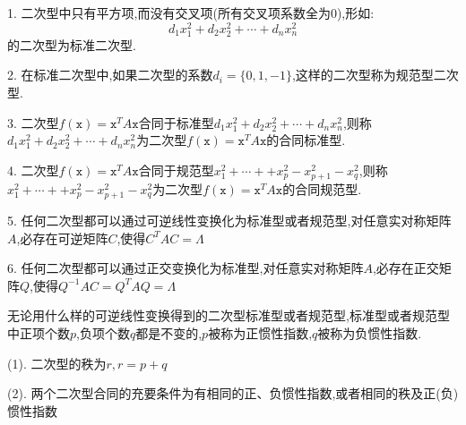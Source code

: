 \begin{definition}[标准型和规范型]
	1. 二次型中只有平方项,而没有交叉项(所有交叉项系数全为0),形如:  
	$$d_{1}x_{1}^2+d_{2}x_{2}^2+\cdots+d_{n}x_{n}^2$$
	的二次型为标准二次型.
	
	2. 在标准二次型中,如果二次型的系数$d_{i}=\{0,1,-1\}$,这样的二次型称为规范型二次型.
	
	3. 二次型$f(\mathtt{x})=\mathtt{x}^{T}A\mathtt{x}$合同于标准型$d_{1}x_{1}^2+d_{2}x_{2}^2+\cdots+d_{n}x_{n}^2$,则称$d_{1}x_{1}^2+d_{2}x_{2}^2+\cdots+d_{n}x_{n}^2$为二次型$f(\mathtt{x})=\mathtt{x}^{T}A\mathtt{x}$的合同标准型.
	
	4. 二次型$f(\mathtt{x})=\mathtt{x}^{T}A\mathtt{x}$合同于规范型$x_{1}^2+\cdots++x_{p}^2-x_{p+1}^2-x_{q}^2$,则称$x_{1}^2+\cdots++x_{p}^2-x_{p+1}^2-x_{q}^2$为二次型$f(\mathtt{x})=\mathtt{x}^{T}A\mathtt{x}$的合同规范型.
	
	5. 任何二次型都可以通过可逆线性变换化为标准型或者规范型,对任意实对称矩阵$A$,必存在可逆矩阵$C$,使得$C^{T}AC=\varLambda$
	
	6. 任何二次型都可以通过正交变换化为标准型,对任意实对称矩阵$A$,必存在正交矩阵$Q$,使得$Q^{-1}AC=Q^{T}AQ=\varLambda$
\end{definition}
\begin{definition}[惯性定理]
	无论用什么样的可逆线性变换得到的二次型标准型或者规范型,标准型或者规范型中正项个数$p$,负项个数$q$都是不变的,$p$被称为正惯性指数,$q$被称为负惯性指数.
\end{definition}
\begin{anymark}[注]
	(1). $\text{二次型的秩为}r,r=p+q$
	
	(2). 两个二次型合同的充要条件为有相同的正、负惯性指数,或者相同的秩及正(负)惯性指数
\end{anymark}
